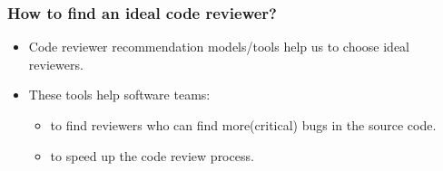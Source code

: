 \documentclass{beamer}
\begin{document}

\begin{frame}
\frametitle{How to find an ideal code reviewer?}

    \begin{itemize}
    \item Code reviewer recommendation models/tools help us to choose ideal reviewers.
    \item These tools help software teams:
        \begin{itemize}
            \item to find reviewers who can find more(critical) bugs in the source code.
            \item to speed up the code review process.
        \end{itemize}
  \end{itemize}


\end{frame}




\end{document}
